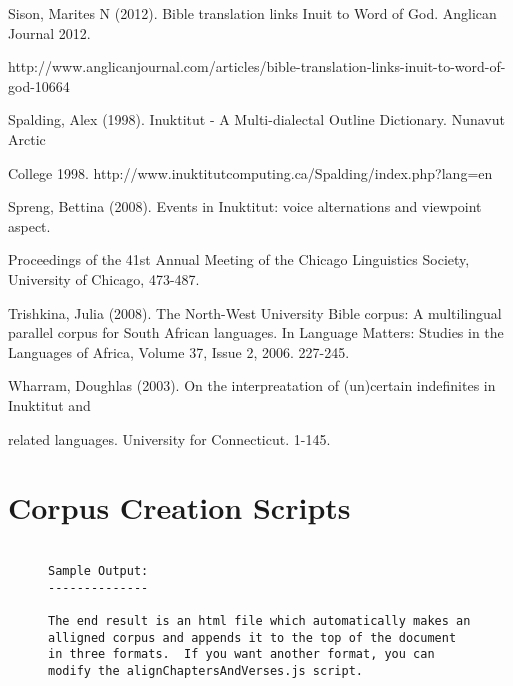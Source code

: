 \documentclass[12pt]{article}
\begin{document}
Sison, Marites N (2012). Bible translation links Inuit to Word of God. Anglican Journal 2012.

http://www.anglicanjournal.com/articles/bible-translation-links-inuit-to-word-of-god-10664

Spalding, Alex (1998). Inuktitut - A Multi-dialectal Outline Dictionary. Nunavut Arctic 

College 1998. http://www.inuktitutcomputing.ca/Spalding/index.php?lang=en



Spreng, Bettina (2008). Events in Inuktitut: voice alternations and viewpoint aspect. 

Proceedings of the 41st Annual Meeting of the Chicago Linguistics Society, University of Chicago, 473-487.
 
Trishkina, Julia (2008). The North-West University Bible corpus: A multilingual parallel
corpus for South African languages. In Language Matters: Studies in the Languages of Africa, Volume 37, Issue 2, 2006. 227-245.


Wharram, Doughlas (2003). On the interpreatation of (un)certain indefinites in Inuktitut and 
	
related languages. University for Connecticut. 1-145.

\appendix 

\section {Corpus Creation Scripts}





\begin{figure}
\begin{verbatim}

Sample Output:
--------------

The end result is an html file which automatically makes an alligned corpus and appends it to the top of the document in three formats.  If you want another format, you can modify the alignChaptersAndVerses.js script.
\end{verbatim}
\end{figure}
\end{document}
